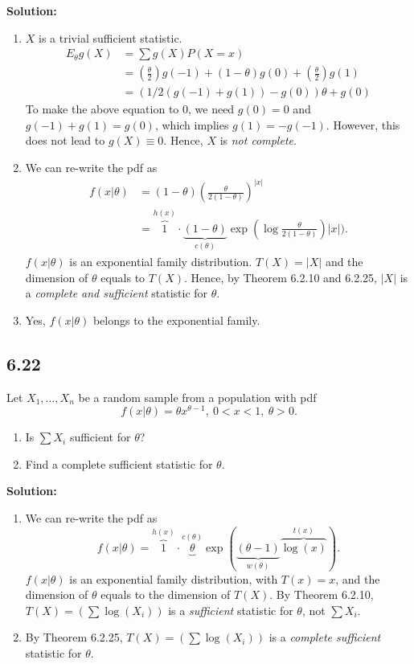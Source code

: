 \documentclass[11pt]{article}
\newcommand{\Sol}{\par {\bf Solution:}}
\newcommand{\sample}[1]{#1_1 , \dots , #1_n}
\begin{document}
\Sol
\begin{enumerate}[label=(\alph*)]
    \item 
    $X$ is a trivial sufficient statistic.
    \begin{align*}
       E_\theta g(X) &= \sum g(X)P(X=x) \\ 
       &= (\frac{\theta}{2}) g(-1) + (1-\theta) g(0) + (\frac{\theta}{2}) g(1) \\
       &= (1/2 (g(-1) + g(1))- g(0))\theta + g(0)
    \end{align*}
    To make the above equation to 0, we need $g(0) =0$ and $g(-1) + g(1) = g(0)$, which implies $g(1) = - g(-1)$. However, this does not lead to $g(X) \equiv 0$. Hence, $X$ is \emph{not complete}.
    \item 
    We can re-write the pdf as
    \begin{align*}
        f(x|\theta) &= (1-\theta) (\frac{\theta}{2(1-\theta)})^{|x|} \\
        &= \overbrace{1}^{h(x)} \cdot \underbrace{(1-\theta)}_{c(\theta)} \exp(
        \log \frac{\theta}{2(1-\theta)}) |x|).
    \end{align*}
    $f(x|\theta)$ is an exponential family distribution. $T(X) = |X|$ and the dimension of $\theta$ equals to $T(X)$. Hence, by Theorem 6.2.10 and 6.2.25, $|X|$ is a \emph{complete and sufficient} statistic for $\theta$.
    \item 
    Yes, $f(x|\theta)$ belongs to the exponential family.
\end{enumerate}


\subsection*{6.22}
Let $\sample{X}$ be a random sample from a population with pdf
$$f(x|\theta) = \theta x^{\theta -1}, ~ 0 < x < 1, ~ \theta > 0.$$
\begin{enumerate}[label=(\alph*)]
\item Is $\sum X_i$ sufficient for $\theta$?
\item Find a complete sufficient statistic for $\theta$.
\end{enumerate}

\Sol
\begin{enumerate}[label=(\alph*)]
    \item 
    We can re-write the pdf as
    $$f(x|\theta) = \overbrace{1}^{h(x)} \cdot \underbrace{\theta}^{c(\theta)} \exp (\underbrace{(\theta - 1)}_{w(\theta)} \overbrace{\log(x)}^{t(x)}).$$
    $f(x|\theta)$ is an exponential family distribution, with $T(x) = x$, and the dimension of $\theta$ equals to the dimension of $T(X)$. By Theorem 6.2.10, $T(X) = (\sum \log(X_i))$ is a \emph{sufficient} statistic for $\theta$, not $\sum X_i$.
    \item  
    By Theorem 6.2.25, $T(X) = (\sum \log(X_i))$ is a \emph{complete sufficient} statistic for $\theta$.
    
\end{enumerate}
\end{document}
